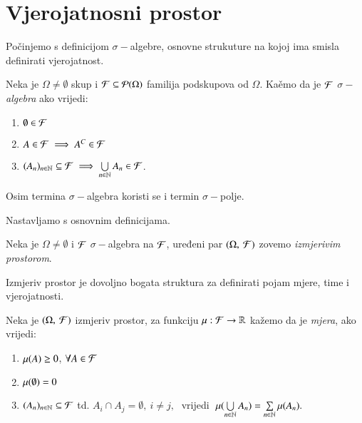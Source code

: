 
\chapter{Vjerojatnosni prostor}


Po\v cinjemo s definicijom $\sigma-$algebre, osnovne strukuture na kojoj ima
smisla definirati vjerojatnost.

\begin{defn}
    Neka je $\Omega \neq \emptyset$ skup i $ \mathcal{F}
        \subseteq \mathcal{P}({\Omega})$ familija podskupova od $\Omega$.
    Ka\v emo da je \emph{$\mathcal{F}$ $\sigma -$algebra} ako vrijedi:
    \begin{enumerate}[label={(\arabic*)}]
        \item $\emptyset \in \mathcal{F}$
        \item $A \in \mathcal{F} \implies A^{C} \in \mathcal{F}$
        \item $(A_n)_{n \in \mathbb{N}} \subseteq \mathcal{F} \implies \bigcup\limits_{n \in \mathbb{N}}^{} A_n \in \mathcal{F}$.
    \end{enumerate}
\end{defn}

\begin{nap}
    Osim termina $\sigma-$algebra koristi se i termin $\sigma-$polje.
\end{nap}

Nastavljamo s osnovnim definicijama.

\begin{defn}
    Neka je $\Omega \neq \emptyset$ i $\mathcal{F}$ $\sigma-$algebra na $\mathcal{F}$, uređeni par
    $(\Omega, \: \mathcal{F})$ zovemo \emph{izmjerivim prostorom}.
\end{defn}

Izmjeriv prostor je dovoljno bogata struktura za definirati pojam mjere, time
i vjerojatnosti.

\begin{defn}
    Neka je $(\Omega, \: \mathcal{F})$ izmjeriv prostor, za funkciju $\mu : \mathcal{F} \to \mathbb{R}$
    ka\v zemo da je \emph{mjera}, ako vrijedi:
    \begin{enumerate}[label={(\arabic*)}]
        \item $\mu({A}) \geq 0$, $\forall A \in \mathcal{F}$
        \item $\mu({\emptyset}) = 0$
        \item $(A_n)_{n \in \mathbb{N}} \subseteq \mathcal{F}$ td. $A_i \cap A_j =
            \emptyset, \: i \neq j, \;$ vrijedi $\; \mu({ \bigcup\limits_{n \in \mathbb{N}}^{} A_n })
            = \sum\limits_{n \in \mathbb{N}}^{} \mu({ A_n }).$
    \end{enumerate}
\end{defn}

